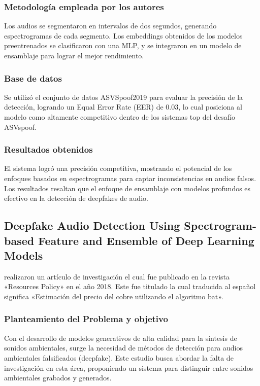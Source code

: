 \subsubsection{Metodología empleada por los autores}
Los audios se segmentaron en intervalos de dos segundos, generando espectrogramas de cada segmento. Los embeddings obtenidos de los modelos preentrenados se clasificaron con una MLP, y se integraron en un modelo de ensamblaje para lograr el mejor rendimiento.

\subsubsection{Base de datos}
Se utilizó el conjunto de datos ASVSpoof2019 para evaluar la precisión de la detección, logrando un Equal Error Rate (EER) de 0.03, lo cual posiciona al modelo como altamente competitivo dentro de los sistemas top del desafío ASVspoof.

\subsubsection{Resultados obtenidos}
El sistema logró una precisión competitiva, mostrando el potencial de los enfoques basados en espectrogramas para captar inconsistencias en audios falsos. Los resultados resaltan que el enfoque de ensamblaje con modelos profundos es efectivo en la detección de deepfakes de audio.

\subsection{Deepfake Audio Detection Using Spectrogram-based Feature and Ensemble of Deep Learning Models \citep*{pr_dehghani2018copper}}
\citeauthor{pr_dehghani2018copper} realizaron un artículo de investigación el cual fue publicado en la revista «Resources Policy» en el año 2018. Este fue titulado  la cual traducida al español significa «Estimación del precio del cobre utilizando el algoritmo bat».

\subsubsection{Planteamiento del Problema y objetivo }
Con el desarrollo de modelos generativos de alta calidad para la síntesis de sonidos ambientales, surge la necesidad de métodos de detección para audios ambientales falsificados (deepfake). Este estudio busca abordar la falta de investigación en esta área, proponiendo un sistema para distinguir entre sonidos ambientales grabados y generados.

